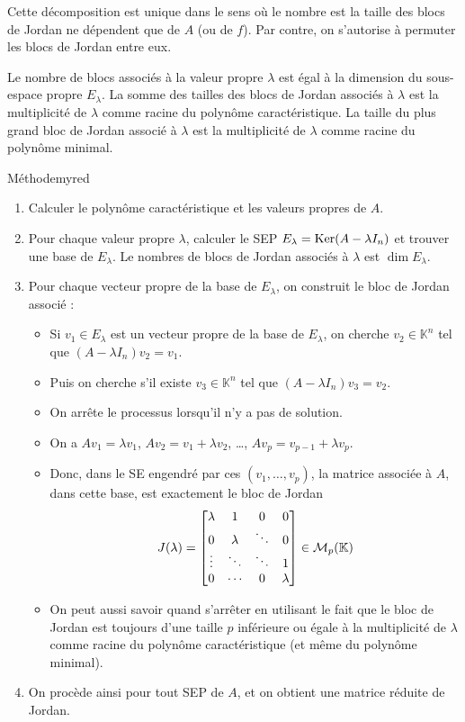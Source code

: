     Cette décomposition est unique dans le sens où le nombre est la taille des blocs de Jordan ne dépendent que de $A$ (ou de $f$). Par contre, on s’autorise à permuter les blocs de Jordan entre eux.

    Le nombre de blocs associés à la valeur propre $\lambda$ est égal à la dimension du sous-espace propre $E_{\lambda}$. La somme des tailles des blocs de Jordan associés à $\lambda$ est la multiplicité de $\lambda$ comme racine du polynôme caractéristique. La taille du plus grand bloc de Jordan associé à $\lambda$ est la multiplicité de $\lambda$ comme racine du polynôme minimal.

    \begin{omed}{Méthode}{myred}
        \begin{enumerate}
            \item Calculer le polynôme caractéristique et les valeurs propres de $A$.
            \item Pour chaque valeur propre $\lambda$, calculer le SEP $E_{\lambda} = \operatorname{Ker}(A - \lambda I_n)$ et trouver une base de $E_{\lambda}$. Le nombres de blocs de Jordan associés à $\lambda$ est $\dim E_{\lambda}$. 
            \item Pour chaque vecteur propre de la base de $E_{\lambda}$, on construit le bloc de Jordan associé : 
            \begin{itemize}
                \item Si $v_1 \in E_{\lambda}$ est un vecteur propre de la base de $E_{\lambda}$, on cherche $v_2 \in \mathbb{K}^n$ tel que $(A - \lambda I_n) v_2 = v_1$.
                \item Puis on cherche s’il existe $v_3 \in \mathbb{K}^n$ tel que $(A - \lambda I_n) v_3 = v_2$. 
                \item On arrête le processus lorsqu’il n’y a pas de solution.
                \item On a $Av_1 = \lambda v_1$, $Av_2 = v_1 + \lambda v_2$, \ldots, $A v_p = v_{p-1} + \lambda v_p$.
                \item Donc, dans le SE engendré par ces $(v_1,\ldots,v_p)$, la matrice associée à $A$, dans cette base, est exactement le bloc de Jordan 
                \[ J(\lambda) = \begin{bmatrix}
            \lambda & 1 & 0 & 0 \\
            0 & \lambda & \ddots & 0 \\
            \vdots & \ddots & \ddots & 1 \\
            0 & \cdots & 0 & \lambda
        \end{bmatrix} \in \mathcal{M}_{p}(\mathbb{K}) \]
                \item On peut aussi savoir quand s’arrêter en utilisant le fait que le bloc de Jordan est toujours d’une taille $p$ inférieure ou égale à la multiplicité de $\lambda$ comme racine du polynôme caractéristique (et même du polynôme minimal).    
            \end{itemize}
            \item On procède ainsi pour tout SEP de $A$, et on obtient une matrice réduite de Jordan.
        \end{enumerate}
    \end{omed}

